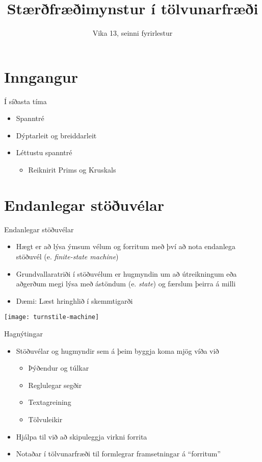 \documentclass[handout]{beamer}
\title{Stærðfræðimynstur í tölvunarfræði}
\subtitle{Vika 13, seinni fyrirlestur}
\begin{document}
\begin{frame}
\titlepage
\end{frame}


\section{Inngangur}

\begin{frame}{Í síðasta tíma}
    \begin{itemize}
        \item Spanntré
        \item Dýptarleit og breiddarleit
        \item Léttustu spanntré
        \begin{itemize}
            \item Reiknirit Prims og Kruskals
        \end{itemize}
    \end{itemize}
\end{frame}

\section{Endanlegar stöðuvélar}

\begin{frame}{Endanlegar stöðuvélar}
\begin{itemize}
 \item Hægt er að lýsa ýmsum vélum og forritum með því að nota endanlega stöðuvél (e. \emph{finite-state machine})
 \item Grundvallaratriði í stöðuvélum er hugmyndin um að útreikningum eða aðgerðum megi lýsa með ástöndum (e. \emph{state}) og færslum þeirra á milli
 \item Dæmi: Læst hringhlið í skemmtigarði
\end{itemize}
\begin{center}
\texttt{[image: turnstile-machine]}
\end{center}
\end{frame}

\begin{frame}{Hagnýtingar}
\begin{itemize}
 \item Stöðuvélar og hugmyndir sem á þeim byggja koma mjög víða við
  \begin{itemize}
  \item Þýðendur og túlkar
  \item Reglulegar segðir
  \item Textagreining
  \item Tölvuleikir
 \end{itemize}
 \item Hjálpa til við að skipuleggja virkni forrita
 \item Notaðar í tölvunarfræði til formlegrar framsetningar á ``forritum''
\end{itemize}
\end{frame}
\end{document}
